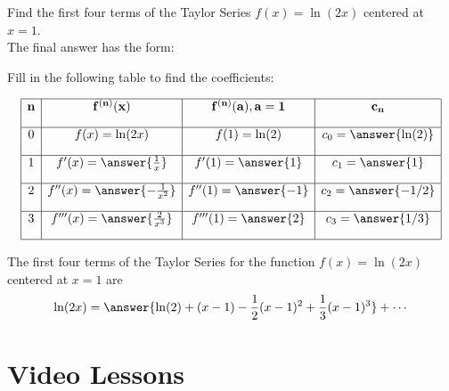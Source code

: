 \documentclass{ximera}
\begin{document}
\begin{problem} Find the first four terms of the Taylor Series $f(x) = \ln(2x)$ centered at $x = 1$.\\


The final answer has the form:
\begin{center}
\begin{multipleChoice}
\end{multipleChoice}
\end{center}

Fill in the following table to find the coefficients:

\[
\begin{array}{|c|c|c|c|} 
\hline
\bf{n} & \bf{f^{(n)}(x)} & \bf{f^{(n)}(a), a = 1} & \bf{c_n} \\[1em] 
\hline
 0 & f(x) = \ln(2x) & f(1) = \ln(2) & c_0 = \answer{\ln(2)} \\[1em]
\hline
1 & f'(x) = \answer{\frac{1}{x}} & f'(1) = \answer{1} & c_1 = \answer{1} \\[1em]
\hline
 2 & f''(x) =\answer{-\frac{1}{x^2}} & f''(1) = \answer{-1} & c_2 = \answer{-1/2} \\[1em]
\hline
 3 & f'''(x) =\answer{\frac{2}{x^3}} & f'''(1) = \answer{2} & c_3 = \answer{1/3}\\[1em]
\hline
\end{array}
\]


The first four terms of the Taylor Series for the function $f(x) = \ln(2x)$ centered at $x = 1$ are
\[
\ln(2x) = \answer{\ln(2) + (x-1) -\frac12(x-1)^2 + \frac13(x-1)^3} + \cdots
\]


\end{problem}





\section{Video Lessons}

\begin{center}
\begin{foldable}
\end{foldable}
\end{center}
\end{document}
